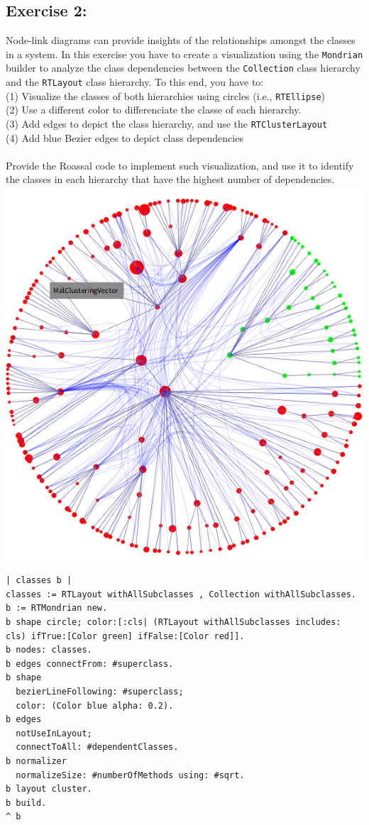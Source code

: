 \documentclass [11pt, a4wide, twoside]{article}
\begin{document}
\subsection*{Exercise 2:}
Node-link diagrams can provide insights of the relationships amongst the classes in a system. In this exercise you have to create a visualization using the \texttt{Mondrian} builder to analyze the class dependencies between the \texttt{Collection} class hierarchy and the \texttt{RTLayout} class hierarchy. To this end, you have to:\\
(1) Visualize the classes of both hierarchies using circles (i.e., \texttt{RTEllipse})\\ 
(2) Use a different color to differenciate the classe of each hierarchy. \\
(3) Add edges to depict the class hierarchy, and use the \texttt{RTClusterLayout} \\
(4) Add blue Bezier edges to depict class dependencies \\
\\
Provide the Roassal code to implement such visualization, and use it to identify the classes in each hierarchy that have the highest number of dependencies. \\

\includegraphics[scale=0.2]{images/cluster.png}


\begin{lstlisting}
| classes b |
classes := RTLayout withAllSubclasses , Collection withAllSubclasses.
b := RTMondrian new.
b shape circle; color:[:cls| (RTLayout withAllSubclasses includes: cls) ifTrue:[Color green] ifFalse:[Color red]].
b nodes: classes.
b edges connectFrom: #superclass.
b shape
  bezierLineFollowing: #superclass;
  color: (Color blue alpha: 0.2).
b edges
  notUseInLayout;
  connectToAll: #dependentClasses.
b normalizer
  normalizeSize: #numberOfMethods using: #sqrt.
b layout cluster.
b build.
^ b
\end{lstlisting}
\end{document}
